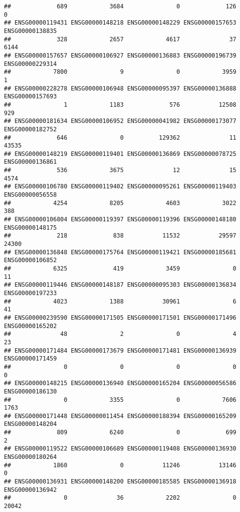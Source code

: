 \documentclass[
]{article}
\begin{document}
\begin{verbatim}
##             689            3684               0             126               0 
## ENSG00000119431 ENSG00000148218 ENSG00000148229 ENSG00000157653 ENSG00000138835 
##             328            2657            4617              37            6144 
## ENSG00000157657 ENSG00000106927 ENSG00000136883 ENSG00000196739 ENSG00000229314 
##            7800               9               0            3959               1 
## ENSG00000228278 ENSG00000106948 ENSG00000095397 ENSG00000136888 ENSG00000157693 
##               1            1183             576           12508             929 
## ENSG00000181634 ENSG00000106952 ENSG00000041982 ENSG00000173077 ENSG00000182752 
##             646               0          129362              11           43535 
## ENSG00000148219 ENSG00000119401 ENSG00000136869 ENSG00000078725 ENSG00000136861 
##             536            3675              12              15            4574 
## ENSG00000106780 ENSG00000119402 ENSG00000095261 ENSG00000119403 ENSG00000056558 
##            4254            8205            4603            3022             388 
## ENSG00000106804 ENSG00000119397 ENSG00000119396 ENSG00000148180 ENSG00000148175 
##             218             838           11532           29597           24300 
## ENSG00000136848 ENSG00000175764 ENSG00000119421 ENSG00000185681 ENSG00000106852 
##            6325             419            3459               0              11 
## ENSG00000119446 ENSG00000148187 ENSG00000095303 ENSG00000136834 ENSG00000197233 
##            4023            1388           30961               6              41 
## ENSG00000239590 ENSG00000171505 ENSG00000171501 ENSG00000171496 ENSG00000165202 
##              48               2               0               4              23 
## ENSG00000171484 ENSG00000173679 ENSG00000171481 ENSG00000136939 ENSG00000171459 
##               0               0               0               0               0 
## ENSG00000148215 ENSG00000136940 ENSG00000165204 ENSG00000056586 ENSG00000186130 
##               0            3355               0            7606            1763 
## ENSG00000171448 ENSG00000011454 ENSG00000188394 ENSG00000165209 ENSG00000148204 
##             809            6240               0             699               2 
## ENSG00000119522 ENSG00000106689 ENSG00000119408 ENSG00000136930 ENSG00000180264 
##            1860               0           11246           13146               0 
## ENSG00000136931 ENSG00000148200 ENSG00000185585 ENSG00000136918 ENSG00000136942 
##               0              36            2202               0           20042 

\end{verbatim}
\end{document}
